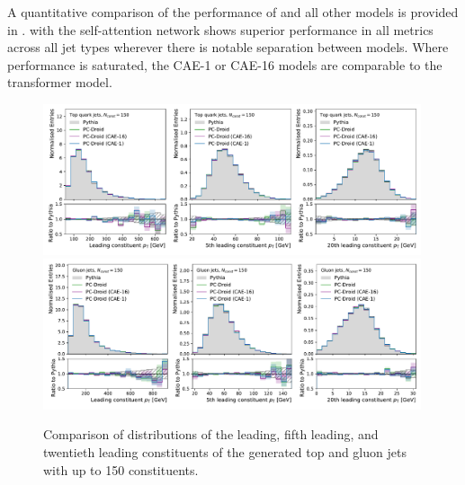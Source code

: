 A quantitative comparison of the performance of \pcdroid and all other models is provided in .
\pcdroid with the self-attention network shows superior performance in all metrics across all jet types wherever there is notable separation between models.
Where performance is saturated, the CAE-1 or CAE-16 models are comparable to the transformer model.

\begin{figure}[tb]
    \centering
    \includegraphics[width=0.99\textwidth]{Figures/jet_generation/droid/150/csts/t/100/t_leading_constituents.pdf}
    \includegraphics[width=0.99\textwidth]{Figures/jet_generation/droid/150/csts/g/100/g_leading_constituents.pdf}
    \caption{Comparison of \pt distributions of the leading, fifth leading, and twentieth leading constituents of the generated top and gluon jets with up to 150 constituents.
    }
    \label{fig:const-pt_dist-150}
\end{figure}


